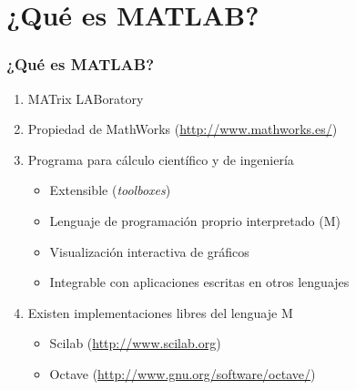 \section{¿Qué es MATLAB?}
\begin{frame}[label=que_es]
    \frametitle{¿Qué es MATLAB?}
    \begin{enumerate}
        \item \alert{MAT}rix \alert{LAB}oratory
        \item Propiedad de MathWorks (\url{http://www.mathworks.es/})
        \item Programa para cálculo científico y de ingeniería
	\begin{itemize}
	 \item Extensible (\emph{toolboxes})
         \item Lenguaje de programación proprio interpretado (\alert{M})
         \item Visualización interactiva de gráficos
         \item Integrable con aplicaciones escritas en otros lenguajes
	\end{itemize}
        \item Existen implementaciones libres del lenguaje M
	\begin{itemize}
	 \item Scilab (\url{http://www.scilab.org})
	 \item Octave (\url{http://www.gnu.org/software/octave/})
	\end{itemize}
    \end{enumerate}
\end{frame}
